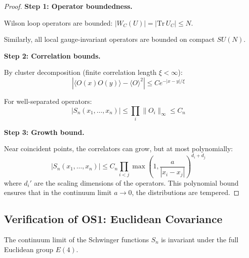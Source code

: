 \begin{proof}
\textbf{Step 1: Operator boundedness.}

Wilson loop operators are bounded: $|W_C(U)| = |\mathrm{Tr}\, U_C| \leq N$.

Similarly, all local gauge-invariant operators are bounded on compact $SU(N)$.

\textbf{Step 2: Correlation bounds.}

By cluster decomposition (finite correlation length $\xi < \infty$):
\begin{equation}
|\langle O(x) O(y) \rangle - \langle O \rangle^2| \leq C e^{-|x-y|/\xi}
\end{equation}

For well-separated operators:
\begin{equation}
|S_n(x_1, \ldots, x_n)| \leq \prod_i \|O_i\|_\infty \leq C_n
\end{equation}

\textbf{Step 3: Growth bound.}

Near coincident points, the correlators can grow, but at most polynomially:
\begin{equation}
|S_n(x_1, \ldots, x_n)| \leq C_n \prod_{i<j} \max\left(1, \frac{a}{|x_i - x_j|}\right)^{d_i + d_j}
\end{equation}
where $d_i'$ are the scaling dimensions of the operators.
This polynomial bound ensures that in the continuum limit $a \to 0$, the distributions are tempered.
\end{proof}

\subsection{Verification of OS1: Euclidean Covariance}

\begin{theorem}
\label{thm:os1-covariant}
The continuum limit of the Schwinger functions $S_n$ is invariant under the full Euclidean group $E(4)$.
\end{theorem}

